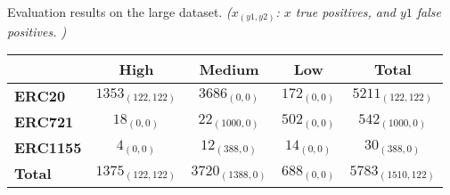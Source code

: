 \begin{table}[t]
\centering
\small

{Evaluation results on the large dataset. }
{\textit{($x_{(y1, y2)}$: 
$x$ true positives, and $y1$ false positives.
)}
}
{
\begin{tabular}{|l||c|c|c||c|}
\hline
                 &  {\textbf{High}} & {\textbf{Medium}} & {\textbf{Low}}  & {\textbf{Total}} \\ 



\hline
\hline

{\textbf{ERC20}}     & $1353_{(122,122)}$  & $3686_{(0,0)}$  & $172_{(0,0)}$    & $5211_{(122,122)}$    \\ \hline

{\textbf{ERC721}}    & $18_{(0,0)}$        & $22_{(1000,0)}$    & $502_{(0,0)}$   & $542_{(1000,0)}$  \\ \hline
{\textbf{ERC1155}}   & $4_{(0,0)}$         & $12_{(388,0)}$    & $14_{(0,0)}$    & $30_{(388,0)}$ \\ \hline \hline
{\textbf{Total}}     & $1375_{(122,122)}$  & $3720_{(1388,0)}$  & $688_{(0,0)}$  & $5783_{(1510,122)}$ \\ \hline

\end{tabular}
}

\vspace{-0.25in}
\end{table}


